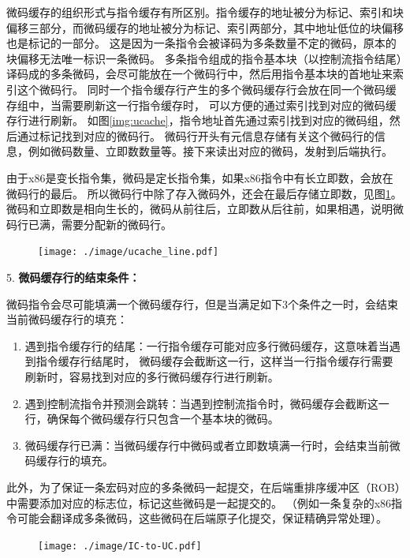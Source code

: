 微码缓存的组织形式与指令缓存有所区别。指令缓存的地址被分为标记、索引和块偏移三部分，而微码缓存的地址被分为标记、索引两部分，其中地址低位的块偏移也是标记的一部分。
这是因为一条指令会被译码为多条数量不定的微码，原本的块偏移无法唯一标识一条微码。
多条指令组成的指令基本块（以控制流指令结尾）译码成的多条微码，会尽可能放在一个微码行中，然后用指令基本块的首地址来索引这个微码行。
同时一个指令缓存行产生的多个微码缓存行会放在同一个微码缓存组中，当需要刷新这一行指令缓存时， 可以方便的通过索引找到对应的微码缓存行进行刷新。
如图\ref{img:ucache}，指令地址首先通过索引找到对应的微码组，然后通过标记找到对应的微码行。
微码行开头有元信息存储有关这个微码行的信息，例如微码数量、立即数数量等。接下来读出对应的微码，发射到后端执行。

由于x86是变长指令集，微码是定长指令集，如果x86指令中有长立即数，会放在微码行的最后。
所以微码行中除了存入微码外，还会在最后存储立即数，见图\ref{img:ucache_line}。
微码和立即数是相向生长的，微码从前往后，立即数从后往前，如果相遇，说明微码行已满，需要分配新的微码行。

\begin{figure}[!htbp]
  \centering
  \texttt{[image: ./image/ucache\_line.pdf]}
  \label{img:ucache_line}
\end{figure}

5. \textbf{微码缓存行的结束条件：}

微码指令会尽可能填满一个微码缓存行，但是当满足如下3个条件之一时，会结束当前微码缓存行的填充\cite{solomonMicrooperationCachePower2001}：
\begin{enumerate}
  \item 遇到指令缓存行的结尾：一行指令缓存可能对应多行微码缓存，这意味着当遇到指令缓存行结尾时，
  微码缓存会截断这一行，这样当一行指令缓存行需要刷新时，容易找到对应的多行微码缓存行进行刷新。
  \item 遇到控制流指令并预测会跳转：当遇到控制流指令时，微码缓存会截断这一行，确保每个微码缓存行只包含一个基本块的微码。
  \item 微码缓存行已满：当微码缓存行中微码或者立即数填满一行时，会结束当前微码缓存行的填充。
\end{enumerate}

此外，为了保证一条宏码对应的多条微码一起提交，在后端重排序缓冲区（ROB）中需要添加对应的标志位，标记这些微码是一起提交的。
（例如一条复杂的x86指令可能会翻译成多条微码，这些微码在后端原子化提交，保证精确异常处理）。

\begin{figure}[!htbp]
  \centering
  \texttt{[image: ./image/IC-to-UC.pdf]}
  \label{img:IC_to_UC}
\end{figure}

